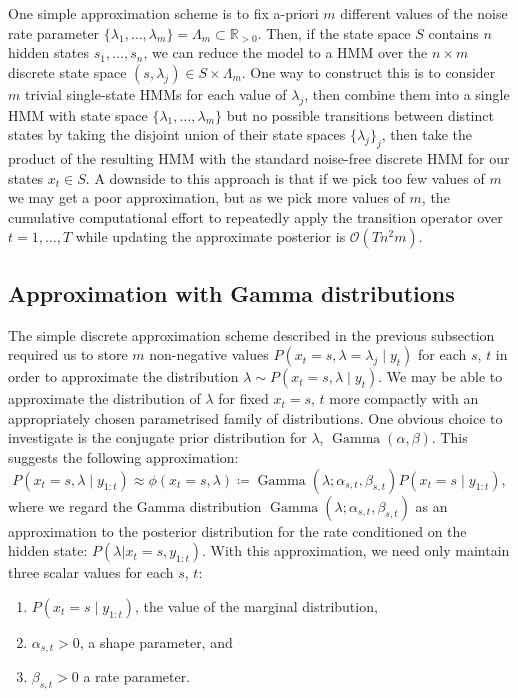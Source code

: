\documentclass[twoside, 11pt]{article}
\DeclareMathOperator*{\gammad}{Gamma}
\newcommand{\reals}[0] {\mathbb{R}}
\newcommand{\bigO}[0] {\mathcal{O}}
\begin{document}
One simple approximation scheme is to fix a-priori $m$ different values of the noise rate parameter $\{ \lambda_1, \ldots, \lambda_m \} = \Lambda_m \subset \reals_{>0}$. Then, if the state space $S$ contains $n$ hidden states $s_1, \ldots, s_n$, we can reduce the model to a HMM over the $n \times m$ discrete state space $(s , \lambda_j ) \in S \times \Lambda_m$. One way to construct this is to consider $m$ trivial single-state HMMs for each value of $\lambda_j$, then combine them into a single HMM with state space $\{ \lambda_1, \ldots, \lambda_m \}$ but no possible transitions between distinct states by taking the disjoint union of their state spaces $\{ \lambda_j \}_j$, then take the product of the resulting HMM with the standard noise-free discrete HMM for our states $x_t \in S$.  A downside to this approach is that if we pick too few values of $m$ we may get a poor approximation, but as we pick more values of $m$, the cumulative computational effort to repeatedly apply the transition operator over $t = 1, \ldots, T$ while updating the approximate posterior is $ \bigO (T n^2 m ) $.

\subsection{Approximation with Gamma distributions}

The simple discrete approximation scheme described in the previous subsection required us to store $m$ non-negative values $P(x_t=s, \lambda=\lambda_j \mid y_t)$ for each $s$, $t$ in order to approximate the distribution $\lambda \sim P(x_t=s, \lambda \mid y_t)$. We may be able to approximate the distribution of $\lambda$ for fixed $x_t=s$, $t$ more compactly with an appropriately chosen parametrised family of distributions. One obvious choice to investigate is the conjugate prior distribution for $\lambda$, $\gammad(\alpha, \beta)$. This suggests the following approximation:
\begin{equation}
P\left(x_t=s, \lambda \mid y_{1:t} \right) \approx \phi(x_t=s, \lambda) \coloneqq \gammad(\lambda ; \alpha_{s,t}, \beta_{s,t}) P(x_t=s \mid y_{1:t} ) ,
\end{equation}
where we regard the Gamma distribution $\gammad(\lambda ; \alpha_{s,t}, \beta_{s,t})$ as an approximation to the posterior distribution for the rate conditioned on the hidden state: $P(\lambda | x_t=s, y_{1:t})$. With this approximation, we need only maintain three scalar values for each $s$, $t$:
\begin{enumerate}
\item $P(x_t=s \mid y_{1:t})$, the value of the marginal distribution,
\item $\alpha_{s,t}>0$, a shape parameter, and
\item $\beta_{s,t}>0$ a rate parameter.
\end{enumerate}
\end{document}
